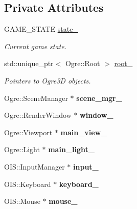\subsection*{Private Attributes}
\begin{DoxyCompactItemize}
\item 
G\+A\+M\+E\+\_\+\+S\+T\+A\+TE \hyperlink{class_game_ab0c5032f689e8e704086a83bf57e3f26}{state\+\_\+}
\begin{DoxyCompactList}\small\item\em Current game state. \end{DoxyCompactList}\item 
std\+::unique\+\_\+ptr$<$ Ogre\+::\+Root $>$ \hyperlink{class_game_ac427345eb3f0b4aa9a6a4a29a195cc61}{root\+\_\+}
\begin{DoxyCompactList}\small\item\em Pointers to Ogre3D objects. \end{DoxyCompactList}\item 
Ogre\+::\+Scene\+Manager $\ast$ {\bfseries scene\+\_\+mgr\+\_\+}\hypertarget{class_game_aea01a069f07ad326a0dd94f1239d06b1}{}\label{class_game_aea01a069f07ad326a0dd94f1239d06b1}

\item 
Ogre\+::\+Render\+Window $\ast$ {\bfseries window\+\_\+}\hypertarget{class_game_a1881d8362923bcf00014d3a22df568fe}{}\label{class_game_a1881d8362923bcf00014d3a22df568fe}

\item 
Ogre\+::\+Viewport $\ast$ {\bfseries main\+\_\+view\+\_\+}\hypertarget{class_game_a31f75ba18f6462b57c8aa9b4d8ec0137}{}\label{class_game_a31f75ba18f6462b57c8aa9b4d8ec0137}

\item 
Ogre\+::\+Light $\ast$ {\bfseries main\+\_\+light\+\_\+}\hypertarget{class_game_a976e47151729dc5e0b4cf60fbdaa7e5e}{}\label{class_game_a976e47151729dc5e0b4cf60fbdaa7e5e}

\item 
O\+I\+S\+::\+Input\+Manager $\ast$ {\bfseries input\+\_\+}\hypertarget{class_game_a7d4c7d5cf1ef4a650c04cc16b0400953}{}\label{class_game_a7d4c7d5cf1ef4a650c04cc16b0400953}

\item 
O\+I\+S\+::\+Keyboard $\ast$ {\bfseries keyboard\+\_\+}\hypertarget{class_game_adcb64e869eada39fe8fb7403311c5411}{}\label{class_game_adcb64e869eada39fe8fb7403311c5411}

\item 
O\+I\+S\+::\+Mouse $\ast$ {\bfseries mouse\+\_\+}\hypertarget{class_game_afa6eb9a23546a694f4bfe175f91ca7d7}{}\label{class_game_afa6eb9a23546a694f4bfe175f91ca7d7}


\end{DoxyCompactItemize}
